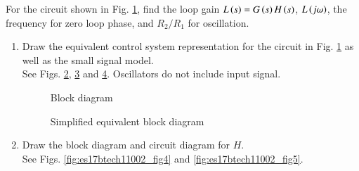 For the circuit shown in Fig. \ref{fig:es17btech11002_fig1}, find the loop gain $L\left(s\right) = G\left(s\right)H\left(s\right)$, $L\left(j\omega\right)$, the frequency for zero loop phase, and $R_{2}/R_{1}$ for oscillation.
\begin{enumerate}[label=\arabic*.,ref=\theenumi]

\item Draw the equivalent control system representation for the circuit in Fig. \ref{fig:es17btech11002_fig1} as well as the small signal model. 
\\
\solution See Figs. \ref{fig:es17btech11002_block}, \ref{fig:es17btech11002_fig2} and \ref{fig:es17btech11002_fig3}. Oscillators do not include input signal.
%
\renewcommand{\thefigure}{\theenumi.\arabic{figure}}
%
\begin{figure}[!ht]
	\begin{center}
		\resizebox{\columnwidth}{!}{}
	\end{center}
\caption{}
\label{fig:es17btech11002_fig1}
\end{figure}
%
\begin{figure}[!ht]
	\begin{center}
		\resizebox{\columnwidth}{!}{}
	\end{center}
\caption{Block diagram}
\label{fig:es17btech11002_block}
\end{figure}
\begin{figure}[!ht]
	\begin{center}
		\resizebox{\columnwidth}{!}{}
	\end{center}
\caption{Simplified equivalent block diagram}
\label{fig:es17btech11002_fig2}
\end{figure}
%
\begin{figure}[!ht]
	\begin{center}
		\resizebox{\columnwidth}{!}{}
	\end{center}
\caption{}
\label{fig:es17btech11002_fig3}
\end{figure}
\renewcommand{\thefigure}{\theenumi}
%
\item Draw the block diagram and circuit diagram for $H$.\\
\solution See Figs. \ref{fig:es17btech11002_fig4} and \ref{fig:es17btech11002_fig5}. 
\renewcommand{\thefigure}{\theenumi.\arabic{figure}}

\end{enumerate}
